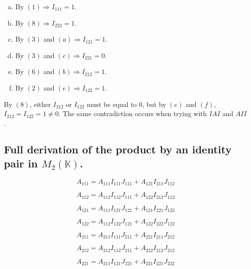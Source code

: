 \begin{enumerate}[(a)]
	\item By $(1) \Rightarrow I_{111} = 1$.
	\item By $(8) \Rightarrow I_{222} = 1$.
	\item By $(3)$ and $(a) \Rightarrow I_{121} = 1$.
	\item By $(3)$ and $(c) \Rightarrow I_{221} = 0$.
	\item By $(6)$ and $(b) \Rightarrow I_{212} = 1$.
	\item By $(2)$ and $(e) \Rightarrow I_{122} = 1$.
\end{enumerate}

By $(8)$, either $I_{212}$ or $I_{122}$ must be equal to $0$, but by $(e)$ and $(f)$, $I_{212} = I_{122} = 1 \neq 0$. The same contradiction occurs when trying with $IAI$ and $AII$.

\subsection{Full derivation of the product by an identity pair in $M_2 (\mathbb{K})$.} \label{appendix-2}

\begin{equation}
A_{111} = A_{111} I_{111} J_{111} + A_{121} I_{211} J_{112}
\end{equation}

\begin{equation}
A_{112} = A_{112} I_{112} J_{111} + A_{122} I_{212} J_{112}
\end{equation}

\begin{equation}
A_{121} = A_{111} I_{121} J_{121} + A_{121} I_{221} J_{122}
\end{equation}

\begin{equation}
A_{122} = A_{112} I_{122} J_{121} + A_{122} I_{222} J_{122}
\end{equation}

\begin{equation}
A_{211} = A_{211} I_{111} J_{211} + A_{221} I_{211} J_{212}
\end{equation}

\begin{equation}
A_{212} = A_{212} I_{112} J_{211} + A_{222} I_{212} J_{212}
\end{equation}

\begin{equation}
A_{221} = A_{211} I_{121} J_{221} + A_{221} I_{221} J_{222}
\end{equation}

